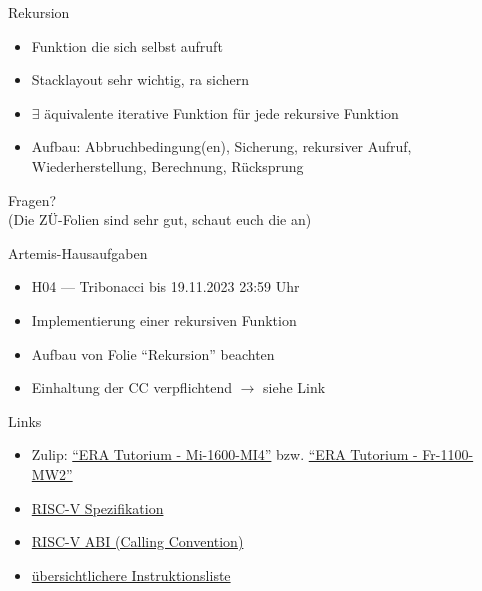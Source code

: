 \begin{frame}[fragile, c]{Rekursion}{}
	\begin{itemize}
		\item Funktion die sich selbst aufruft
		\item Stacklayout sehr wichtig, ra sichern
		\item $\exists$ äquivalente iterative Funktion für jede rekursive Funktion
		\item Aufbau: Abbruchbedingung(en), Sicherung, rekursiver Aufruf, Wiederherstellung, Berechnung, Rücksprung
	\end{itemize}
\end{frame}


\begin{frame}[c]{}{}
	\begin{center}
		\LARGE Fragen?\\
		\Large (Die ZÜ-Folien sind sehr gut, schaut euch die an)
	\end{center}
\end{frame}

\begin{frame}[c]{Artemis-Hausaufgaben}{}
	\begin{itemize}
		\item H04 --- Tribonacci bis 19.11.2023 23:59 Uhr
		\item Implementierung einer rekursiven Funktion
		\item Aufbau von Folie \enquote{Rekursion} beachten
		\item Einhaltung der CC verpflichtend $\rightarrow$ siehe Link
	\end{itemize}
\end{frame}

\begin{frame}[fragile, c]{Links}{}
	\begin{itemize}
		\item Zulip: \href{https://zulip.in.tum.de/#narrow/stream/1917-ERA-Tutorium---Mi-1600-MI4}{\enquote{ERA Tutorium - Mi-1600-MI4}}
		      bzw. \href{https://zulip.in.tum.de/#narrow/stream/1940-ERA-Tutorium---Fr-1100-MW2}{\enquote{ERA Tutorium - Fr-1100-MW2}}
		\item \href{https://riscv.org/wp-content/uploads/2017/05/riscv-spec-v2.2.pdf}{RISC-V Spezifikation}
		\item \href{https://www.moodle.tum.de/mod/url/view.php?id=2810277}{RISC-V ABI (Calling Convention)}
		\item \href{https://msyksphinz-self.github.io/riscv-isadoc/html/rvi.html}{übersichtlichere Instruktionsliste}
	\end{itemize}
\end{frame}

\maketitle


